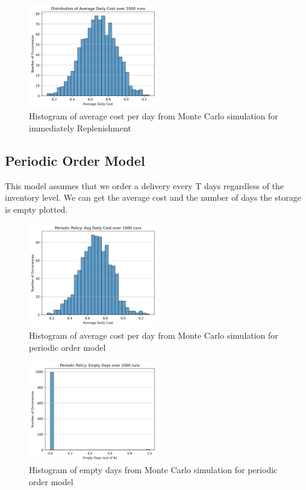 \documentclass[11pt]{article}
\begin{document}
\begin{figure}[H]
    \centering
    \includegraphics[width=0.5\textwidth]{cost_histogram}
    \caption{Histogram of average cost per day from Monte Carlo simulation for immediately Replenishment}
    \label{average_cost}
\end{figure}

\subsection{Periodic Order Model}
This model assumes that we order a delivery every T days regardless of the inventory level. We can get the average cost and the number of days the storage is empty plotted.

\begin{figure}[H]
    \centering
    \includegraphics[width=0.5\textwidth]{periodic_cost_histogram}
    \caption{Histogram of average cost per day from Monte Carlo simulation for periodic order model}
    \label{average_cost_periodic}
\end{figure}

\begin{figure}[H]
    \centering
    \includegraphics[width=0.5\textwidth]{periodic_emptydays_histogram}
    \caption{Histogram of empty days from Monte Carlo simulation for periodic order model}
    \label{empty_days}
\end{figure}
\end{document}
